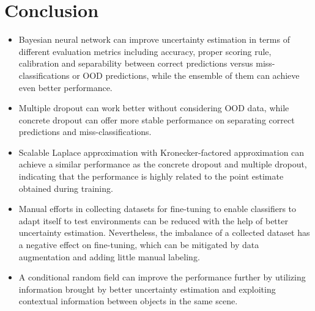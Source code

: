 \section{Conclusion}
\begin{itemize}
	\item Bayesian neural network can improve uncertainty estimation in terms of different evaluation metrics including accuracy, proper scoring rule, calibration and separability between correct predictions versus miss-classifications or OOD predictions, while the ensemble of them can achieve even better performance.
	
	\item Multiple dropout can work better without considering \gls{OOD} data, while concrete dropout can offer more stable performance on separating correct predictions and miss-classifications.
	
	\item Scalable Laplace approximation with Kronecker-factored approximation can achieve a similar performance as the concrete dropout and multiple dropout, indicating that the performance is highly related to the point estimate obtained during training.
	
	\item Manual efforts in collecting datasets for fine-tuning to enable classifiers to adapt itself to test environments can be reduced with the help of better uncertainty estimation. Nevertheless, the imbalance of a collected dataset has a negative effect on fine-tuning, which can be mitigated by data augmentation and adding little manual labeling.
	
	\item A conditional random field can improve the performance further by utilizing information brought by better uncertainty estimation and exploiting contextual information between objects in the same scene.
	
\end{itemize}


